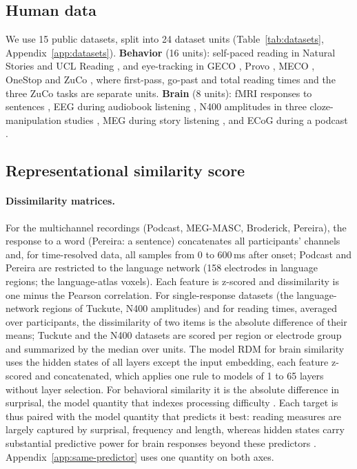 \subsection{Human data}
\label{sec:design-data}

We use 15 public datasets, split into 24 dataset units (Table~\ref{tab:datasets}, Appendix~\ref{app:datasets}). \textbf{Behavior} (16 units): self-paced reading in Natural Stories \citep{futrell2021natural} and UCL Reading \citep{frank2013reading}, and eye-tracking in GECO \citep{cop2017geco}, Provo \citep{luke2018provo}, MECO \citep{siegelman2022meco}, OneStop \citep{berzak2025onestop} and ZuCo \citep{hollenstein2018zuco}, where first-pass, go-past and total reading times and the three ZuCo tasks are separate units. \textbf{Brain} (8 units): fMRI responses to sentences \citep{pereira2018toward,tuckute2024driving}, EEG during audiobook listening \citep{broderick2018electrophysiological}, N400 amplitudes in three cloze-manipulation studies \citep{nieuwland2018largescale,federmeier2007multiple,szewczyk2022context}, MEG during story listening \citep{gwilliams2022neural}, and ECoG during a podcast \citep{zada2025podcast}.

\subsection{Representational similarity score}
\label{sec:design-rdms}

\paragraph{Dissimilarity matrices.} For the multichannel recordings (Podcast, MEG-MASC, Broderick, Pereira), the response to a word (Pereira: a sentence) concatenates all participants' channels and, for time-resolved data, all samples from 0 to 600\,ms after onset; Podcast and Pereira are restricted to the language network (158 electrodes in language regions; the language-atlas voxels). Each feature is z-scored and dissimilarity is one minus the Pearson correlation. For single-response datasets (the language-network regions of Tuckute, N400 amplitudes) and for reading times, averaged over participants, the dissimilarity of two items is the absolute difference of their means; Tuckute and the N400 datasets are scored per region or electrode group and summarized by the median over units. The model RDM for brain similarity uses the hidden states of all layers except the input embedding, each feature z-scored \citep{timkey2021allbark} and concatenated, which applies one rule to models of 1 to 65 layers without layer selection. For behavioral similarity it is the absolute difference in surprisal, the model quantity that indexes processing difficulty \citep{hale2001probabilistic,levy2008expectation}. Each target is thus paired with the model quantity that predicts it best: reading measures are largely captured by surprisal, frequency and length, whereas hidden states carry substantial predictive power for brain responses beyond these predictors \citep{devarda2026behavioral}. Appendix~\ref{app:same-predictor} uses one quantity on both axes.

